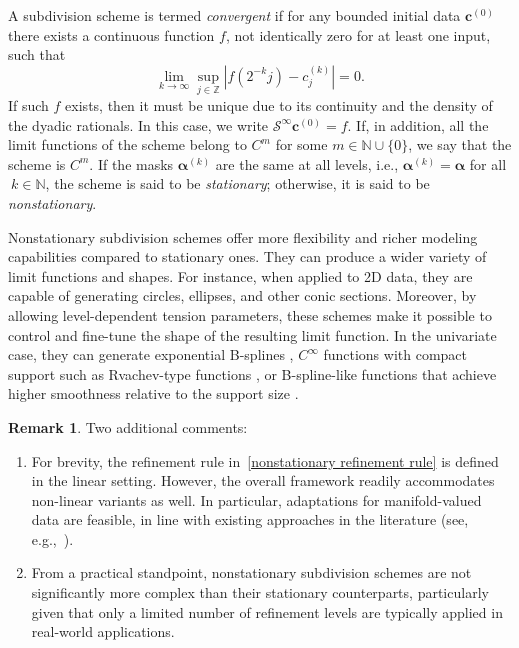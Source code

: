 \documentclass[11pt,a4paper]{article}
\newcommand{\N}{\mathbb{N}}
\theoremstyle{definition}
\newtheorem{remark}[theorem]{Remark}
\begin{document}
A subdivision scheme is termed \emph{convergent} if for any bounded initial data $\boldsymbol{c}^{(0)}$ there exists a continuous function $f$, not identically zero for at least one input, such that
\begin{equation}
    \lim_{k \rightarrow \infty} \sup_{j \in \mathbb{Z}} |f(2^{-k}j)-c^{(k)}_j|=0.
\end{equation}
If such $f$ exists, then it must be unique due to its continuity and the density of the dyadic rationals. In this case, we write $\boldsymbol{\mathcal{S}}^{\infty}\boldsymbol{c}^{(0)}=f$. If, in addition, all the limit functions of the scheme belong to $C^m$ for some $m\in\N\cup\{0\}$, we say that the scheme is $C^m$. If the masks $\boldsymbol{\alpha}^{(k)}$ are the same at all levels, i.e., $\boldsymbol{\alpha}^{(k)}=\boldsymbol{\alpha}$ for all $\ k\in \N$, the scheme is said to be \emph{stationary}; otherwise, it is said to be \emph{nonstationary}.

Nonstationary subdivision schemes offer more flexibility and richer modeling capabilities compared to stationary ones. They can produce a wider variety of limit functions and shapes. For instance, when applied to 2D data, they are capable of generating circles, ellipses, and other conic sections. Moreover, by allowing level-dependent tension parameters, these schemes make it possible to control and fine-tune the shape of the resulting limit function. In the univariate case, they can generate exponential B-splines \cite{dyn1995analysis}, $C^\infty$ functions with compact support such as Rvachev-type functions \cite{dyn2002subdivision}, or B-spline-like functions that achieve higher smoothness relative to the support size \cite{charina2016limits, conti2007totally}.

\begin{remark}
Two additional comments:
    \begin{enumerate}
     \item 
        For brevity, the refinement rule in~\eqref{nonstationary refinement rule} is defined in the linear setting. However, the overall framework readily accommodates non-linear variants as well. In particular, adaptations for manifold-valued data are feasible, in line with existing approaches in the literature (see, e.g.,~\cite{dyn2017manifold}).        
        \item 
        From a practical standpoint, nonstationary subdivision schemes are not significantly more complex than their stationary counterparts, particularly given that only a limited number of refinement levels are typically applied in real-world applications.
    \end{enumerate}
\end{remark}
\end{document}
